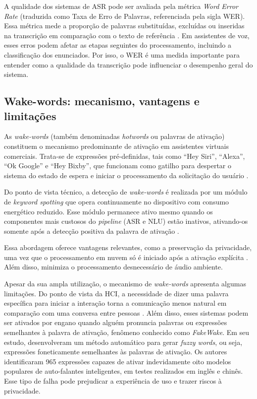 \documentclass[
    12pt,                %
    openright,           %
    oneside,             %
    a4paper,             %
    english,             %
    brazil               %
]{abntex2}
\begin{document}
A qualidade dos sistemas de ASR pode ser avaliada pela métrica \textit{Word Error Rate} (traduzida como Taxa de Erro de Palavras, referenciada pela sigla WER). Essa métrica mede a proporção de palavras substituídas, excluídas ou inseridas na transcrição em comparação com o texto de referência \cite{Jurafsky2026}. Em assistentes de voz, esses erros podem afetar as etapas seguintes do processamento, incluindo a classificação dos enunciados. Por isso, o WER é uma medida importante para entender como a qualidade da transcrição pode influenciar o desempenho geral do sistema.


\subsection{Wake-words: mecanismo, vantagens e limitações}

As \textit{wake-words} (também denominadas \textit{hotwords} ou palavras de ativação) constituem o mecanismo predominante de ativação em assistentes virtuais comerciais. Trata-se de expressões pré-definidas, tais como ``Hey Siri'', ``Alexa'', ``Ok Google'' e ``Hey Bixby'', que funcionam como gatilho para despertar o sistema do estado de espera e iniciar o processamento da solicitação do usuário \cite{Garg2021}.

Do ponto de vista técnico, a detecção de \textit{wake-words} é realizada por um módulo de \textit{keyword spotting} que opera continuamente no dispositivo com consumo energético reduzido. Esse módulo permanece ativo mesmo quando os componentes mais custosos do \textit{pipeline} (ASR e NLU) estão inativos, ativando-os somente após a detecção positiva da palavra de ativação \cite{Garg2021}.

Essa abordagem oferece vantagens relevantes, como a preservação da privacidade, uma vez que o processamento em nuvem só é iniciado após a ativação explícita \cite{Chen2021}. Além disso, minimiza o processamento desnecessário de áudio ambiente.

Apesar da sua ampla utilização, o mecanismo de \textit{wake-words} apresenta algumas limitações. Do ponto de vista da HCI, a necessidade de dizer uma palavra específica para iniciar a interação torna a comunicação menos natural em comparação com uma conversa entre pessoas \cite{Nie2021}. Além disso, esses sistemas podem ser ativados por engano quando alguém pronuncia palavras ou expressões semelhantes à palavra de ativação, fenômeno conhecido como \textit{FakeWake}. Em seu estudo,  desenvolveram um método automático para gerar \textit{fuzzy words}, ou seja, expressões foneticamente semelhantes às palavras de ativação. Os autores identificaram 965 expressões capazes de ativar indevidamente oito modelos populares de auto-falantes inteligentes, em testes realizados em inglês e chinês. Esse tipo de falha pode prejudicar a experiência de uso e trazer riscos à privacidade.
\end{document}
